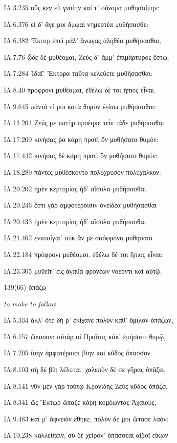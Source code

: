 \begin{enumerate}
{ΙΛ.3.235 οὕς κεν ἐῢ γνοίην καί τ' οὔνομα μυθησαίμην:

ΙΛ.6.376 εἰ δ' ἄγε μοι δμῳαὶ νημερτέα μυθήσασθε:

ΙΛ.6.382 Ἕκτορ ἐπεὶ μάλ' ἄνωγας ἀληθέα μυθήσασθαι,

ΙΛ.7.76 ὧδε δὲ μυθέομαι, Ζεὺς δ' ἄμμ' ἐπιμάρτυρος ἔστω:

ΙΛ.7.284 Ἰδαῖ' Ἕκτορα ταῦτα κελεύετε μυθήσασθαι:

ΙΛ.8.40 πρόφρονι μυθέομαι, ἐθέλω δέ τοι ἤπιος εἶναι.

ΙΛ.9.645 πάντά τί μοι κατὰ θυμὸν ἐείσω μυθήσασθαι:

ΙΛ.11.201 Ζεύς με πατὴρ προέηκε τεῒν τάδε μυθήσασθαι.

ΙΛ.17.200 κινήσας ῥα κάρη προτὶ ὃν μυθήσατο θυμόν:

ΙΛ.17.442 κινήσας δὲ κάρη προτὶ ὃν μυθήσατο θυμόν:

ΙΛ.18.289 πάντες μυθέσκοντο πολύχρυσον πολύχαλκον:

ΙΛ.20.202 ἠμὲν κερτομίας ἠδ' αἴσυλα μυθήσασθαι.

ΙΛ.20.246 ἔστι γὰρ ἀμφοτέροισιν ὀνείδεα μυθήσασθαι

ΙΛ.20.433 ἠμὲν κερτομίας ἠδ' αἴσυλα μυθήσασθαι.

ΙΛ.21.462 ἐννοσίγαι' οὐκ ἄν με σαόφρονα μυθήσαιο

ΙΛ.22.184 πρόφρονι μυθέομαι, ἐθέλω δέ τοι ἤπιος εἶναι:

ΙΛ.23.305 μυθεῖτ' εἰς ἀγαθὰ φρονέων νοέοντι καὶ αὐτῷ:

}

\clearpage
\item[\large 139(66)]{\large \g ὀπάζω	}

\hspace{0.2cm} \textit{ to make to follow }

{\g
ΙΛ.5.334 ἀλλ' ὅτε δή ῥ' ἐκίχανε πολὺν καθ' ὅμιλον ὀπάζων,

ΙΛ.6.157 ὤπασαν: αὐτάρ οἱ Προῖτος κάκ' ἐμήσατο θυμῷ,

ΙΛ.7.205 ἴσην ἀμφοτέροισι βίην καὶ κῦδος ὄπασσον.

ΙΛ.8.103 σὴ δὲ βίη λέλυται, χαλεπὸν δέ σε γῆρας ὀπάζει,

ΙΛ.8.141 νῦν μὲν γὰρ τούτῳ Κρονίδης Ζεὺς κῦδος ὀπάζει

ΙΛ.8.341 ὣς Ἕκτωρ ὤπαζε κάρη κομόωντας Ἀχαιούς,

ΙΛ.9.483 καί μ' ἀφνειὸν ἔθηκε, πολὺν δέ μοι ὤπασε λαόν:

ΙΛ.10.238 καλλείπειν, σὺ δὲ χείρον' ὀπάσσεαι αἰδοῖ εἴκων

}
\end{enumerate}
